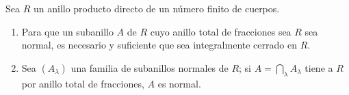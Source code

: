 \begin{lemma}[6.14.1.1]
\label{IV.2.s6.14.1.1-fr}
Sea $R$ un anillo producto directo de un número finito de cuerpos.
\begin{enumerate}
\item[\textup{(i)}] Para que un subanillo $A$ de $R$ cuyo anillo total de fracciones
sea $R$ sea normal, es necesario y suficiente que sea integralmente
cerrado en $R$.
\item[\textup{(ii)}] Sea $(A_\lambda)$ una familia de subanillos normales de $R$;
si $A=\bigcap_\lambda A_\lambda$ tiene a $R$ por anillo total de
fracciones, $A$ es normal.
\end{enumerate}
\end{lemma}
